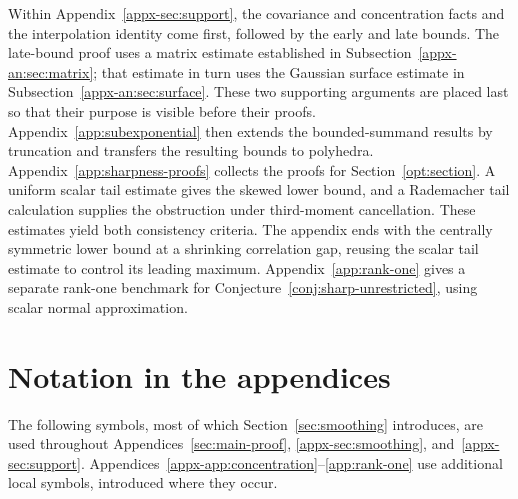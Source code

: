\documentclass[11pt,letterpaper]{article}
\theoremstyle{remark}
\begin{document}
Within Appendix~\ref{appx-sec:support}, the covariance and concentration
facts and the interpolation identity come first, followed by the early and late
bounds. The late-bound proof uses a matrix estimate established in
Subsection~\ref{appx-an:sec:matrix}; that estimate in turn uses the
Gaussian surface estimate in Subsection~\ref{appx-an:sec:surface}.
These two supporting arguments are placed last so that their purpose
is visible before their proofs. Appendix~\ref{app:subexponential}
then extends the bounded-summand results by truncation and transfers
the resulting bounds to polyhedra. Appendix~\ref{app:sharpness-proofs}
collects the proofs for Section~\ref{opt:section}. A uniform scalar
tail estimate gives the skewed lower bound, and a Rademacher tail
calculation supplies the obstruction under third-moment cancellation.
These estimates yield both consistency criteria. The appendix ends
with the centrally symmetric lower bound at a shrinking correlation gap,
reusing the scalar tail estimate to control its leading maximum.
Appendix~\ref{app:rank-one} gives a separate rank-one benchmark for
Conjecture~\ref{conj:sharp-unrestricted}, using scalar normal approximation.

\section*{Notation in the appendices}
The following symbols, most of which Section~\ref{sec:smoothing}
introduces, are used throughout
Appendices~\ref{sec:main-proof}, \ref{appx-sec:smoothing},
and~\ref{appx-sec:support}.
Appendices~\ref{appx-app:concentration}--\ref{app:rank-one}
use additional local symbols, introduced
where they occur.
\end{document}

